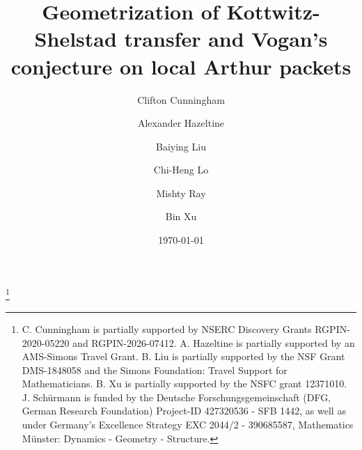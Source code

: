 \documentclass[11pt,letterpaper]{amsart}
\numberwithin{equation}{section}
\begin{document}
\title[Geometrization of Kottwitz-Shelstad Transfer]{Geometrization of Kottwitz-Shelstad transfer and Vogan's conjecture on local Arthur packets}

\author[Cunningham]{Clifton Cunningham}
\address{Department of Mathematics and Statistics, University of Calgary, Alberta, T2N 1N4,
CANADA}

\author[Hazeltine]{Alexander Hazeltine}
\address{Department of Mathematics\\
Columbia University\\
New York, NY, 10027, USA}

\author[Liu]{Baiying Liu}
\address{Department of Mathematics\\
Purdue University\\
West Lafayette, IN, 47907, USA}

\author[Lo]{Chi-Heng Lo}
\address{Department of Mathematics,
National University of Singapore,
119076, Singapore}

\author[Ray]{Mishty Ray}
\address{Department of Mathematics and Statistics\\ University of British Columbia\\
Vancouver,
CANADA}

\author[Xu]{Bin Xu}
\address{Yau Mathematical Sciences Center, Jing Zhai 207, Tsinghua University, 
Haidian District, Beijing 100084}

\address{Mathematisches Institut\\
University of Münster\\
Einsteinstr. 62, 48149 Münster,
GERMANY}



\date{\today}


\thanks{C. Cunningham is partially supported by NSERC Discovery Grants RGPIN-2020-05220 and RGPIN-2026-07412. A. Hazeltine is partially supported by an AMS-Simons Travel Grant. B. Liu is partially supported by the NSF Grant DMS-1848058 and the Simons Foundation: Travel Support for Mathematicians. B. Xu is partially supported by the NSFC grant 12371010.
J. Schürmann is funded by the Deutsche Forschungsgemeinschaft
(DFG, German Research Foundation) Project-ID 427320536 - SFB 1442, as well as under
Germany’s Excellence Strategy EXC 2044/2 - 390685587, Mathematics Münster: Dynamics
- Geometry - Structure.}
\end{document}
